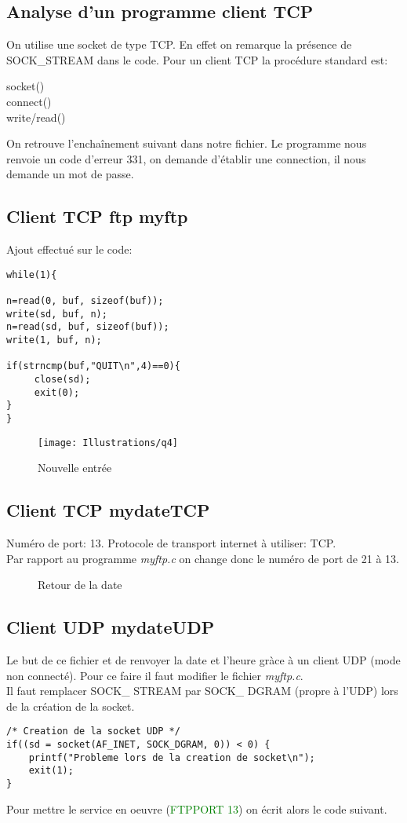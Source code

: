 \documentclass[paper=a4, fontsize=12pt]{article}
\numberwithin{equation}{section}		%
\numberwithin{figure}{section}			%
\numberwithin{table}{section}				%
\begin{document}
\subsection{Analyse d'un programme client TCP}

On utilise une socket de type TCP. En effet on remarque la présence de SOCK\_STREAM dans le code. 
Pour un client TCP la procédure standard est:

\begin{center}
socket() \\
connect()\\
write/read()\\
\end{center}
On retrouve l'enchaînement suivant dans notre fichier.
Le programme nous renvoie un code d'erreur 331, on demande d'établir une connection, il nous demande un mot de passe.

\subsection{Client TCP ftp myftp}
Ajout effectué sur le code:
\begin{verbatim}
while(1){

n=read(0, buf, sizeof(buf));
write(sd, buf, n);
n=read(sd, buf, sizeof(buf));
write(1, buf, n);
   
if(strncmp(buf,"QUIT\n",4)==0){
     close(sd);
     exit(0);
}
}
\end{verbatim}
\begin{figure}[h!]
\centerline{\texttt{[image: Illustrations/q4]}}
\caption{\label{Illustrations/q4} Nouvelle entrée}
\end{figure}
\subsection{Client TCP mydateTCP}
Numéro de port: 13. Protocole de transport internet à utiliser: TCP.\\
Par rapport au programme \textit{myftp.c} on change donc le numéro de port de 21 à 13.
\begin{figure}[h!]
\caption{\label{Illustrations/q5}Retour de la date}
\end{figure}
\subsection{Client UDP mydateUDP}
Le but de ce fichier et de renvoyer la date et l'heure gràce à un client UDP (mode non connecté). Pour ce faire il faut modifier le fichier \textit{myftp.c}.
\\
Il faut remplacer SOCK\_ STREAM par SOCK\_ DGRAM (propre à l'UDP) lors de la création de la socket.
\begin{verbatim}
/* Creation de la socket UDP */
if((sd = socket(AF_INET, SOCK_DGRAM, 0)) < 0) {
	printf("Probleme lors de la creation de socket\n");
	exit(1);
}
\end{verbatim}
Pour mettre le service en oeuvre (\textcolor{green}{FTPPORT 13}) on écrit alors le code suivant.
\end{document}
